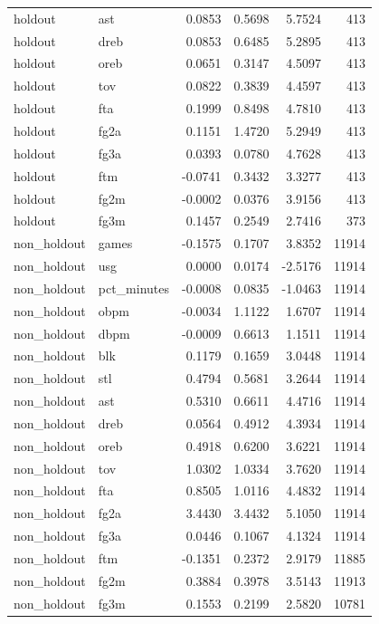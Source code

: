 \begin{table}
\begin{tabular}{llrrrr}
holdout & ast & 0.0853 & 0.5698 & 5.7524 & 413 \\
holdout & dreb & 0.0853 & 0.6485 & 5.2895 & 413 \\
holdout & oreb & 0.0651 & 0.3147 & 4.5097 & 413 \\
holdout & tov & 0.0822 & 0.3839 & 4.4597 & 413 \\
holdout & fta & 0.1999 & 0.8498 & 4.7810 & 413 \\
holdout & fg2a & 0.1151 & 1.4720 & 5.2949 & 413 \\
holdout & fg3a & 0.0393 & 0.0780 & 4.7628 & 413 \\
holdout & ftm & -0.0741 & 0.3432 & 3.3277 & 413 \\
holdout & fg2m & -0.0002 & 0.0376 & 3.9156 & 413 \\
holdout & fg3m & 0.1457 & 0.2549 & 2.7416 & 373 \\
non\_holdout & games & -0.1575 & 0.1707 & 3.8352 & 11914 \\
non\_holdout & usg & 0.0000 & 0.0174 & -2.5176 & 11914 \\
non\_holdout & pct\_minutes & -0.0008 & 0.0835 & -1.0463 & 11914 \\
non\_holdout & obpm & -0.0034 & 1.1122 & 1.6707 & 11914 \\
non\_holdout & dbpm & -0.0009 & 0.6613 & 1.1511 & 11914 \\
non\_holdout & blk & 0.1179 & 0.1659 & 3.0448 & 11914 \\
non\_holdout & stl & 0.4794 & 0.5681 & 3.2644 & 11914 \\
non\_holdout & ast & 0.5310 & 0.6611 & 4.4716 & 11914 \\
non\_holdout & dreb & 0.0564 & 0.4912 & 4.3934 & 11914 \\
non\_holdout & oreb & 0.4918 & 0.6200 & 3.6221 & 11914 \\
non\_holdout & tov & 1.0302 & 1.0334 & 3.7620 & 11914 \\
non\_holdout & fta & 0.8505 & 1.0116 & 4.4832 & 11914 \\
non\_holdout & fg2a & 3.4430 & 3.4432 & 5.1050 & 11914 \\
non\_holdout & fg3a & 0.0446 & 0.1067 & 4.1324 & 11914 \\
non\_holdout & ftm & -0.1351 & 0.2372 & 2.9179 & 11885 \\
non\_holdout & fg2m & 0.3884 & 0.3978 & 3.5143 & 11913 \\
non\_holdout & fg3m & 0.1553 & 0.2199 & 2.5820 & 10781 \\
\bottomrule
\end{tabular}
\end{table}
